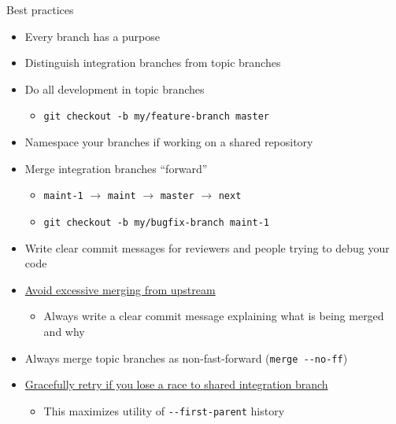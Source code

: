 \documentclass{beamer}
\begin{document}
\begin{frame}{Best practices}
  \begin{itemize}
  \item Every branch has a purpose
  \item Distinguish integration branches from topic branches
  \item Do all development in topic branches
    \begin{itemize}
    \item \texttt{git checkout -b my/feature-branch master}
    \end{itemize}
  \item Namespace your branches if working on a shared repository
  \item Merge integration branches ``forward''
    \begin{itemize}
    \item \texttt{maint-1} $\to$ \texttt{maint} $\to$ \texttt{master} $\to$ \texttt{next}
    \item \texttt{git checkout -b my/bugfix-branch maint-1}
    \end{itemize}
  \item Write clear commit messages for reviewers and people trying to debug your code
  \item \href{https://bitbucket.org/petsc/petsc/wiki/developer-instructions-git\#markdown-header-merging}{Avoid excessive merging from upstream}
    \begin{itemize}
    \item Always write a clear commit message explaining what is being merged and why
    \end{itemize}
  \item Always merge topic branches as non-fast-forward (\texttt{merge -{}-no-ff})
  \item \href{https://bitbucket.org/petsc/petsc/wiki/developer-instructions-git\#markdown-header-racy-integration}{Gracefully retry if you lose a race to shared integration branch}
    \begin{itemize}
    \item This maximizes utility of \texttt{-{}-first-parent} history
    \end{itemize}
  \end{itemize}
\end{frame}
\end{document}
